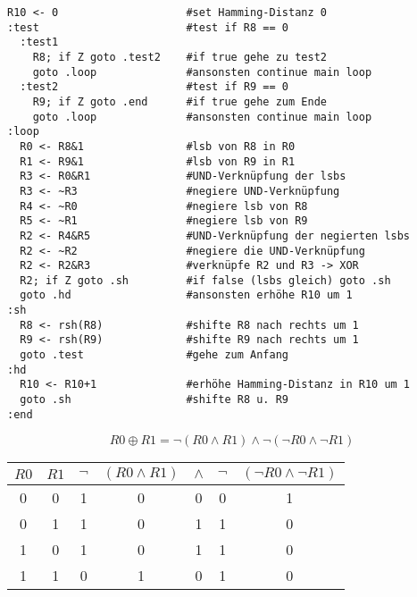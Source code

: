 \documentclass[a4paper, 12pt, margins=2cm]{homework}
\begin{document}
  \begin{problem}
  \end{problem}
  \begin{solution} \hfill

    \begin{lstlisting}
R10 <- 0                    #set Hamming-Distanz 0
:test                       #test if R8 == 0
  :test1
    R8; if Z goto .test2    #if true gehe zu test2
    goto .loop              #ansonsten continue main loop
  :test2                    #test if R9 == 0
    R9; if Z goto .end      #if true gehe zum Ende
    goto .loop              #ansonsten continue main loop
:loop
  R0 <- R8&1                #lsb von R8 in R0
  R1 <- R9&1                #lsb von R9 in R1
  R3 <- R0&R1               #UND-Verknüpfung der lsbs
  R3 <- ~R3                 #negiere UND-Verknüpfung
  R4 <- ~R0                 #negiere lsb von R8
  R5 <- ~R1                 #negiere lsb von R9
  R2 <- R4&R5               #UND-Verknüpfung der negierten lsbs
  R2 <- ~R2                 #negiere die UND-Verknüpfung
  R2 <- R2&R3               #verknüpfe R2 und R3 -> XOR
  R2; if Z goto .sh         #if false (lsbs gleich) goto .sh
  goto .hd                  #ansonsten erhöhe R10 um 1
:sh
  R8 <- rsh(R8)             #shifte R8 nach rechts um 1
  R9 <- rsh(R9)             #shifte R9 nach rechts um 1
  goto .test                #gehe zum Anfang
:hd
  R10 <- R10+1              #erhöhe Hamming-Distanz in R10 um 1
  goto .sh                  #shifte R8 u. R9
:end\end{lstlisting}
   \[ R0 \oplus R1 = \neg (R0 \wedge R1) \wedge \neg (\neg R0 \wedge \neg R1) \]
    \begin{center}
      \begin{tabular}{cc|cc|c|cc}
        $R0$ & $R1$ & $\neg$ & $(R0 \wedge R1)$ & $\wedge$ & $\neg$ & $(\neg R0 \wedge \neg R1)$ \\ \hline
        0    & 0    & 1      & 0                & 0        & 0      & 1                          \\
        0    & 1    & 1      & 0                & 1        & 1      & 0                          \\
        1    & 0    & 1      & 0                & 1        & 1      & 0                          \\
        1    & 1    & 0      & 1                & 0        & 1      & 0                         
      \end{tabular}
    \end{center}
  \end{solution}
\end{document}
